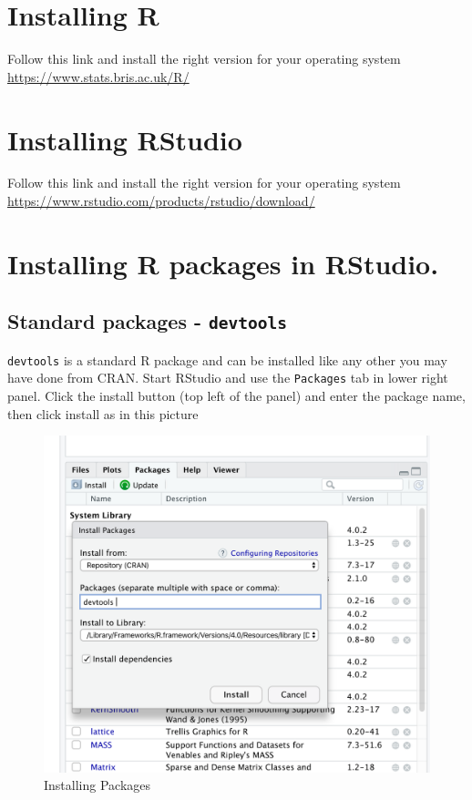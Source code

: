 \documentclass[
]{book}
\begin{document}
\hypertarget{installing-r}{%
\section{Installing R}\label{installing-r}}

Follow this link and install the right version for your operating system \url{https://www.stats.bris.ac.uk/R/}

\hypertarget{installing-rstudio}{%
\section{Installing RStudio}\label{installing-rstudio}}

Follow this link and install the right version for your operating system \url{https://www.rstudio.com/products/rstudio/download/}

\hypertarget{installing-r-packages-in-rstudio.}{%
\section{Installing R packages in RStudio.}\label{installing-r-packages-in-rstudio.}}

\hypertarget{standard-packages---devtools}{%
\subsection{\texorpdfstring{Standard packages - \texttt{devtools}}{Standard packages - devtools}}\label{standard-packages---devtools}}

\texttt{devtools} is a standard R package and can be installed like any other you may have done from CRAN. Start RStudio and use the \texttt{Packages} tab in lower right panel. Click the install button (top left of the panel) and enter the package name, then click install as in this picture

\begin{figure}
\centering
\includegraphics{fig/package_install.png}
\caption{Installing Packages}
\end{figure}
\end{document}
